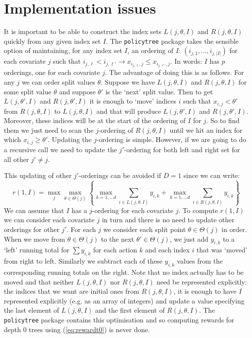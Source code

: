\documentclass{article}
\newcommand{\splitval}{\ensuremath{\theta}}
\newcommand{\splitvals}{\ensuremath{\Theta}}
\newcommand{\depth}{\ensuremath{D}}
\begin{document}
\section{Implementation issues}
\label{sec:implementation}

It is important to be able to construct the index sets
$L(j,\splitval,I)$ and $R(j,\splitval,I)$ quickly from any given index
set $I$. The \texttt{policytree} package takes the sensible option of
maintaining, for any index set $I$, an ordering of $I$:
$(i_{j,1}, \dots, i_{j,|I|})$ for each covariate $j$ such that
$i_{j,\ell} < i_{j,\ell'} \rightarrow x_{i_{j,\ell},j} \leq
x_{i_{j,\ell'},j}$. In words: $I$ has $p$ orderings, one for each
covariate $j$. The advantage of doing this is as follows. For any $j$
we can order split values $\theta$. Suppose we have $L(j,\splitval,I)$
and $R(j,\splitval,I)$ for some split value $\splitval$ and suppose
$\splitval'$ is the `next' split value. Then to get
$L(j,\splitval',I)$ and $R(j,\splitval',I)$ it is enough to `move'
indices $i$ such that $x_{i,j} < \splitval'$ from $R(j,\splitval,I)$
to $L(j,\splitval,I)$ and that will produce $L(j,\splitval',I)$ and
$R(j,\splitval',I)$. Moreover, these indices will be at the start of
the ordering of $I$ for $j$. So to find them we just need to scan the
$j$-ordering of $R(j,\splitval,I)$ until we hit an index for which
$x_{i,j} \geq \splitval'$. Updating the $j$-ordering is
simple. However, if we are going to do a recursive call we need to
update the $j'$-ordering for both left and right set for all other $j'
\neq j$.


This updating of other $j'$-orderings can be avoided if $\depth = 1$
since we can write:
\begin{equation}
  \label{eq:depthone}
  r(1,I) = \max_{j}\max_{\splitval \in \splitvals(j)} \left\{ \max_{k=1,\dots d} \sum_{i \in
     L(j,\splitval,I) } y_{i,k} + \max_{k=1,\dots d} \sum_{i \in R(j,\splitval,I)} y_{i,k} \right\}
\end{equation}
We can assume that $I$ has a $j$-ordering for each covariate $j$.  To
compute $r(1,I)$ we can consider each covariate $j$ in turn and there
is no need to update other orderings for other $j'$. For each $j$ we
consider each split point $\splitval \in \splitvals(j)$ in order. When
we move from $\splitval \in \splitvals(j)$ to the next
$\splitval' \in \splitvals(j)$, we just add $y_{i,k}$ to a `left'
running total for $\sum y_{i,k}$ for each action $k$ and each index
$i$ that was `moved' from right to left. Similarly we subtract each of
these $y_{i,k}$ values from the corresponding running totals on the
right. Note that no index actually
has to be moved and that neither $L(j,\splitval,I)$ nor
$R(j,\splitval,I)$ need be represented explicitly: the indices that we
want are initial ones from $R(j,\splitval,I)$, it is enough to have
$I$ represented explicitly (e.g. as an array of integers) and update
a value specifying the last element of $L(j,\splitval,I)$ and the
first element of $R(j,\splitval,I)$.   The \texttt{policytree} package contains this optimisation and
so computing rewards for depth 0 trees using (\ref{eq:rewardt0}) is
never done.
\end{document}
